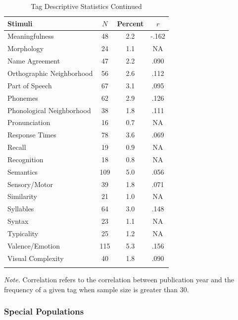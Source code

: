 \documentclass[english,,man]{apa6}
\theoremstyle{definition}
\theoremstyle{definition}
\theoremstyle{definition}
\theoremstyle{remark}
\begin{document}
\begin{table}[tbp]
\begin{center}
\begin{threeparttable}
\caption{\label{tab:tag-table2}Tag Descriptive Statistics Continued}
\small{
\begin{tabular}{lccc}
\toprule
Stimuli & $N$ & Percent & $r$\\
\midrule
Meaningfulness & 48 & 2.2 & -.162\\
Morphology & 24 & 1.1 & NA\\
Name Agreement & 47 & 2.2 & .090\\
Orthographic Neighborhood & 56 & 2.6 & .112\\
Part of Speech & 67 & 3.1 & .095\\
Phonemes & 62 & 2.9 & .126\\
Phonological Neighborhood & 38 & 1.8 & .111\\
Pronunciation & 16 & 0.7 & NA\\
Response Times & 78 & 3.6 & .069\\
Recall & 19 & 0.9 & NA\\
Recognition & 18 & 0.8 & NA\\
Semantics & 109 & 5.0 & .056\\
Sensory/Motor & 39 & 1.8 & .071\\
Similarity & 21 & 1.0 & NA\\
Syllables & 64 & 3.0 & .148\\
Syntax & 23 & 1.1 & NA\\
Typicality & 25 & 1.2 & NA\\
Valence/Emotion & 115 & 5.3 & .156\\
Visual Complexity & 40 & 1.8 & .090\\
\bottomrule
\addlinespace
\end{tabular}
}
\begin{tablenotes}[para]
\normalsize{\textit{Note.} Correlation refers to the correlation between publication year and the frequency of a given tag when sample size is greater than 30.}
\end{tablenotes}
\end{threeparttable}
\end{center}
\end{table}

\hypertarget{special-populations}{%
\subsubsection{Special Populations}\label{special-populations}}
\end{document}
